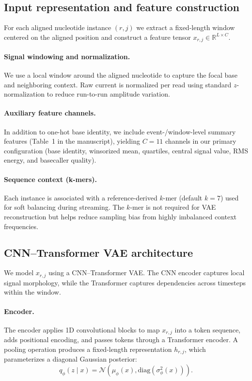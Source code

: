\documentclass[journal,article,submit,pdftex,moreauthors]{Definitions/mdpi}
\begin{document}
\subsection{Input representation and feature construction}
For each aligned nucleotide instance $(r,j)$ we extract a fixed-length window centered on the
aligned position and construct a feature tensor $x_{r,j}\in \mathbb{R}^{L\times C}$.

\paragraph{Signal windowing and normalization.}
We use a local window around the aligned nucleotide to capture the focal base and neighboring
context. Raw current is normalized per read using standard $z$-normalization to reduce
run-to-run amplitude variation.

\paragraph{Auxiliary feature channels.}
In addition to one-hot base identity, we include event-/window-level summary features (Table~1 in
the manuscript), yielding $C=11$ channels in our primary configuration (base identity, winsorized
mean, quartiles, central signal value, RMS energy, and basecaller quality).

\paragraph{Sequence context (k-mers).}
Each instance is associated with a reference-derived $k$-mer (default $k=7$) used for soft balancing
during streaming. The $k$-mer is not required for VAE reconstruction but helps reduce sampling bias
from highly imbalanced context frequencies.

\subsection{CNN--Transformer VAE architecture}
We model $x_{r,j}$ using a CNN--Transformer VAE. The CNN encoder captures local signal morphology,
while the Transformer captures dependencies across timesteps within the window.

\paragraph{Encoder.}
The encoder applies 1D convolutional blocks to map $x_{r,j}$ into a token sequence, adds positional
encoding, and passes tokens through a Transformer encoder. A pooling operation produces a
fixed-length representation $h_{r,j}$, which parameterizes a diagonal Gaussian posterior:
\begin{equation}
q_\phi(z\mid x) = \mathcal{N}\!\left(\mu_\phi(x),\mathrm{diag}(\sigma_\phi^2(x))\right).
\end{equation}
\end{document}
